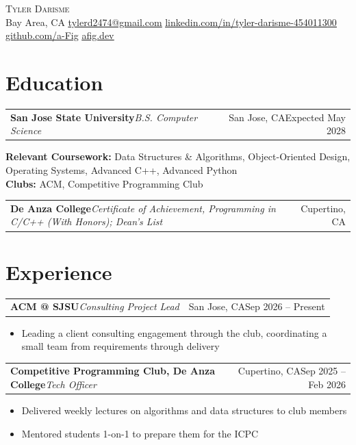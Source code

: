 \documentclass[letterpaper,11pt]{article}
\makeatletter
\newenvironment{bullets}{\small\begin{itemize}}{\end{itemize}\vspace{1pt}}
\newcommand{\sep}{\enspace\textbar\enspace}
\newcommand{\link}[2]{\href{#1}{\underline{#2}}}
\newcommand{\entry}[3]{%
  \begin{tabular*}{\linewidth}{@{}l@{\extracolsep{\fill}}r@{}}
    \textbf{#1}\sep\textit{\small #2} & {\small #3} \\
  \end{tabular*}\par}
\makeatother
\begin{document}
\begin{center}
  {\Huge\scshape Tyler Darisme}\\[3pt]
  \small
  Bay Area, CA\sep
  \link{mailto:tylerd2474@gmail.com}{tylerd2474@gmail.com}\sep
  \link{https://www.linkedin.com/in/tyler-darisme-454011300/}{linkedin.com/in/tyler-darisme-454011300}\sep
  \link{https://github.com/a-Fig/}{github.com/a-Fig}\sep
  \link{https://afig.dev/}{afig.dev}
\end{center}
\vspace{-7pt}

\section{Education}
\entry{San Jose State University}{B.S. Computer Science}{San Jose, CA\sep Expected May 2028}
{\small
  \textbf{Relevant Coursework:} Data Structures \& Algorithms, Object-Oriented Design, Operating Systems, Advanced C++, Advanced Python\\
  \textbf{Clubs:} ACM, Competitive Programming Club\par}
\vspace{1pt}
\entry{De Anza College}{Certificate of Achievement, Programming in C/C++ (With Honors); Dean's List}{Cupertino, CA}

\section{Experience}
\entry{ACM @ SJSU}{Consulting Project Lead}{San Jose, CA\sep Sep 2026 -- Present}
\begin{bullets}
  \item Leading a client consulting engagement through the club, coordinating a small team from requirements through delivery
\end{bullets}

\entry{Competitive Programming Club, De Anza College}{Tech Officer}{Cupertino, CA\sep Sep 2025 -- Feb 2026}
\begin{bullets}
  \item Delivered weekly lectures on algorithms and data structures to club members
  \item Mentored students 1-on-1 to prepare them for the ICPC
\end{bullets}
\end{document}
